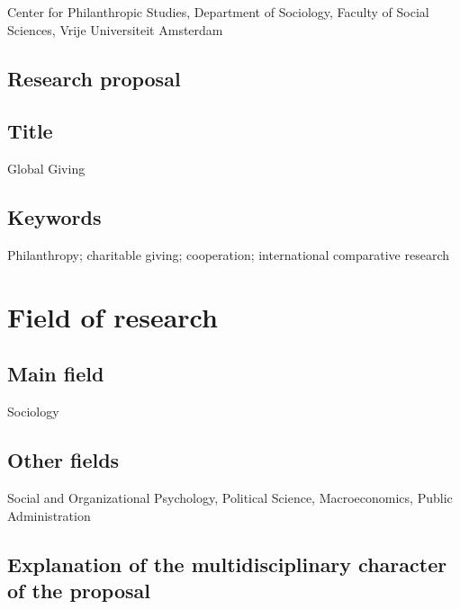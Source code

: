\documentclass[twocolumn, serif, rga, numeric]{jote-article}
\begin{document}
Center for Philanthropic Studies, Department of Sociology, Faculty of Social Sciences, Vrije Universiteit Amsterdam 
 {}\subsection*{Research proposal} 

 {}\subsection*{Title} 

Global Giving 
 {}\subsection*{Keywords} 

Philanthropy; charitable giving; cooperation; international comparative research 
 {}\section*{Field of research} 

 {}\subsection*{Main field} 

Sociology 
 {}\subsection*{Other fields} 

Social and Organizational Psychology, Political Science, Macroeconomics, Public Administration 
 {}\subsection*{Explanation of the multidisciplinary character of the proposal} 
\end{document}
